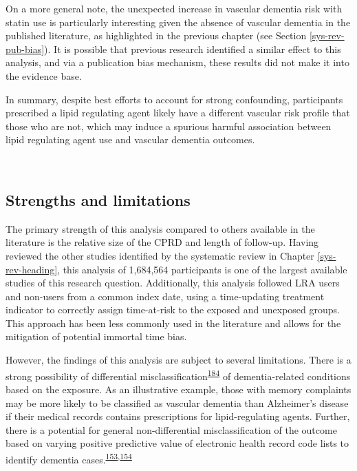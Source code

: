 \documentclass[a4paper, twoside]{templates/ociamthesis}
\begin{document}
On a more general note, the unexpected increase in vascular dementia risk with statin use is particularly interesting given the absence of vascular dementia in the published literature, as highlighted in the previous chapter (see Section \ref{sys-rev-pub-bias}). It is possible that previous research identified a similar effect to this analysis, and via a publication bias mechanism, these results did not make it into the evidence base.

In summary, despite best efforts to account for strong confounding, participants prescribed a lipid regulating agent likely have a different vascular risk profile that those who are not, which may induce a spurious harmful association between lipid regulating agent use and vascular dementia outcomes.

~

\hypertarget{strengths-and-limitations-1}{%
\subsection{Strengths and limitations}\label{strengths-and-limitations-1}}

The primary strength of this analysis compared to others available in the literature is the relative size of the CPRD and length of follow-up. Having reviewed the other studies identified by the systematic review in Chapter \ref{sys-rev-heading}, this analysis of 1,684,564 participants is one of the largest available studies of this research question. Additionally, this analysis followed LRA users and non-users from a common index date, using a time-updating treatment indicator to correctly assign time-at-risk to the exposed and unexposed groups. This approach has been less commonly used in the literature and allows for the mitigation of potential immortal time bias.

However, the findings of this analysis are subject to several limitations. There is a strong possibility of differential misclassification\textsuperscript{\protect\hyperlink{ref-porta2014dictionary}{184}} of dementia-related conditions based on the exposure. As an illustrative example, those with memory complaints may be more likely to be classified as vascular dementia than Alzheimer's disease if their medical records contains prescriptions for lipid-regulating agents. Further, there is a potential for general non-differential misclassification of the outcome based on varying positive predictive value of electronic health record code lists to identify dementia cases.\textsuperscript{\protect\hyperlink{ref-mcguinness2019validity}{153},\protect\hyperlink{ref-wilkinson2018}{154}}
\end{document}
